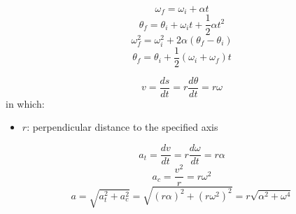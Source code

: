         \begin{equation}
            \omega_{f} = \omega_{i} + \alpha t
        \end{equation}
        \begin{equation}
            \theta_{f} = \theta_{i} + \omega_{i}t + \dfrac{1}{2}\alpha t^{2}
        \end{equation}
        \begin{equation}
            \omega_{f}^2 = \omega_{i}^2 + 2\alpha(\theta_{f} - \theta_{i})
        \end{equation}
        \begin{equation}
            \theta_{f} = \theta_{i} + \dfrac{1}{2}(\omega_{i} + \omega_{f})t
        \end{equation}

            \begin{equation}
                v = \dfrac{ds}{dt} = r \dfrac{d \theta}{dt} = r \omega
            \end{equation}
            in which:
            \begin{itemize}
                \item $r$: perpendicular distance to the specified axis
            \end{itemize}

                \begin{equation}
                    a_{t} = \dfrac{dv}{dt} = r \dfrac{d \omega}{dt} = r \alpha
                \end{equation}
                \begin{equation}
                    a_{c} = \dfrac{v^{2}}{r} = r \omega^{2}
                \end{equation}
                \begin{equation}
                    a = \sqrt{a_{t}^2 + a_{c}^2} = \sqrt{(r \alpha)^{2} + (r \omega^{2})^{2}} = r \sqrt{\alpha^{2} + \omega^{4}}
                \end{equation}
        \hiiEND


